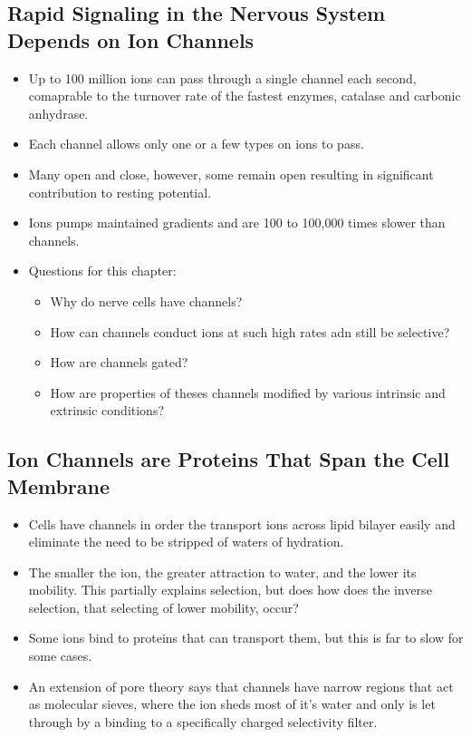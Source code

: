 \documentclass[12pt,a4paper]{article}
\begin{document}
\subsection{Rapid Signaling in the Nervous System Depends on Ion Channels}
\begin{itemize}
    \item Up to 100 million ions can pass through a single channel each second, comaprable to the turnover rate of the fastest enzymes, catalase and carbonic anhydrase.
    \item Each channel allows only one or a few types on ions to pass.
    \item Many open and close, however, some remain open resulting in significant contribution to resting potential. 
    \item Ions pumps maintained gradients and are 100 to 100,000 times slower than channels.
    \item Questions for this chapter:
        \begin{itemize}
            \item Why do nerve cells have channels?
            \item How can channels conduct ions at such high rates adn still be selective?
            \item How are channels gated?
            \item How are properties of theses channels modified by various intrinsic and extrinsic conditions?
        \end{itemize}
\end{itemize}

\subsection{Ion Channels are Proteins That Span the Cell Membrane}
\begin{itemize}
    \item Cells have channels in order the transport ions across lipid bilayer easily and eliminate the need to be stripped of waters of hydration.
    \item The smaller the ion, the greater attraction to water, and the lower its mobility. This partially explains selection, but does how does the inverse selection, that selecting of lower mobility, occur?
    \item Some ions bind to proteins that can transport them, but this is far to slow for some cases.
    \item An extension of pore theory says that channels have narrow regions that act as molecular sieves, where the ion sheds most of it's water and only is let through by a binding to a specifically charged selectivity filter. 
\end{itemize}
\end{document}
